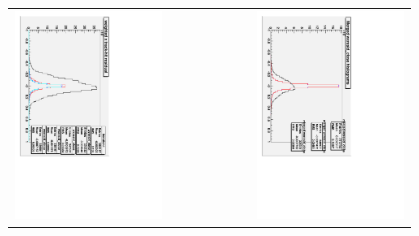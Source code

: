 \documentclass[compress]{beamer}
\begin{document}
\begin{frame}
\begin{center}
\begin{tabular}{p{0.4\linewidth} c p{0.4\linewidth}}
  \begin{minipage}{\linewidth}
    \includegraphics[height=\linewidth, angle=90]{wxresid_convergence.pdf}
  \end{minipage} & &
  \begin{minipage}{\linewidth}
    \includegraphics[height=\linewidth, angle=90]{wxresid_endcap_only.pdf}

\end{minipage}
\end{tabular}
\end{center}
\end{frame}
\end{document}
